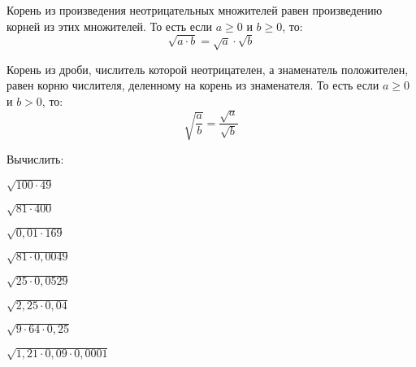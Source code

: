 %
%
\begin{class}[number=3]
	\begin{definit}
		Корень из произведения неотрицательных множителей равен произведению корней из этих множителей. То есть если \( a\ge0 \) и \( b\ge0 \), то: \[ \sqrt{a \cdot b}=\sqrt{a}\cdot\sqrt{b} \]
	\end{definit}
	\begin{definit}
		Корень из дроби,  числитель которой неотрицателен, а знаменатель положителен, равен корню числителя, деленному на корень из знаменателя. То есть если \( a\ge0 \) и \( b>0 \), то: \[ \sqrt{\dfrac{a}{b}}=\dfrac{\sqrt{a}}{\sqrt{b}} \]
	\end{definit}
	\begin{listofex}
		\item Вычислить:
		\begin{enumcols}[itemcolumns=3]
			\item \( \sqrt{100\cdot49} \)
			\item \( \sqrt{81\cdot400} \)
			\item \( \sqrt{0,01\cdot169} \)
			\item \( \sqrt{81\cdot0,0049} \)
			\item \( \sqrt{25\cdot0,0529} \)
			\item \( \sqrt{2,25\cdot0,04} \)
			\item \( \sqrt{9\cdot64\cdot0,25} \)
			\item \( \sqrt{1,21\cdot0,09\cdot0,0001} \)
			

\end{enumcols}
\end{listofex}
\end{class}
